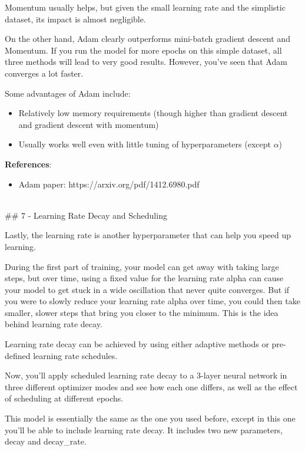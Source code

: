 \documentclass[11pt]{article}
\providecommand{\tightlist}{%
      \setlength{\itemsep}{0pt}\setlength{\parskip}{0pt}}
\begin{document}
Momentum usually helps, but given the small learning rate and the
simplistic dataset, its impact is almost negligible.

On the other hand, Adam clearly outperforms mini-batch gradient descent
and Momentum. If you run the model for more epochs on this simple
dataset, all three methods will lead to very good results. However,
you've seen that Adam converges a lot faster.

Some advantages of Adam include:

\begin{itemize}
\tightlist
\item
  Relatively low memory requirements (though higher than gradient
  descent and gradient descent with momentum)
\item
  Usually works well even with little tuning of hyperparameters (except
  \(\alpha\))
\end{itemize}

    \textbf{References}:

\begin{itemize}
\tightlist
\item
  Adam paper: https://arxiv.org/pdf/1412.6980.pdf
\end{itemize}

    ~\\
\#\# 7 - Learning Rate Decay and Scheduling

Lastly, the learning rate is another hyperparameter that can help you
speed up learning.

During the first part of training, your model can get away with taking
large steps, but over time, using a fixed value for the learning rate
alpha can cause your model to get stuck in a wide oscillation that never
quite converges. But if you were to slowly reduce your learning rate
alpha over time, you could then take smaller, slower steps that bring
you closer to the minimum. This is the idea behind learning rate decay.

Learning rate decay can be achieved by using either adaptive methods or
pre-defined learning rate schedules.

Now, you'll apply scheduled learning rate decay to a 3-layer neural
network in three different optimizer modes and see how each one differs,
as well as the effect of scheduling at different epochs.

This model is essentially the same as the one you used before, except in
this one you'll be able to include learning rate decay. It includes two
new parameters, decay and decay\_rate.
\end{document}

